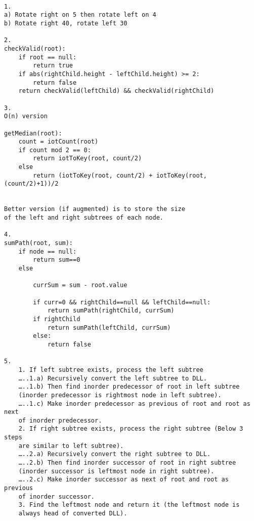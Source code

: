 \documentclass{article}
\begin{document}
\begin{lstlisting}

1. 
a) Rotate right on 5 then rotate left on 4
b) Rotate right 40, rotate left 30

2.
checkValid(root):
    if root == null:
        return true
    if abs(rightChild.height - leftChild.height) >= 2:
        return false
    return checkValid(leftChild) && checkValid(rightChild)
    
3.
O(n) version

getMedian(root):
    count = iotCount(root)
    if count mod 2 == 0:
        return iotToKey(root, count/2)
    else
        return (iotToKey(root, count/2) + iotToKey(root, (count/2)+1))/2


Better version (if augmented) is to store the size 
of the left and right subtrees of each node.

4.
sumPath(root, sum):
    if node == null:
        return sum==0
    else
    
        currSum = sum - root.value
        
        if curr=0 && rightChild==null && leftChild==null:
            return sumPath(rightChild, currSum)
        if rightChild
            return sumPath(leftChild, currSum)
        else:
            return false
        
5.
    1. If left subtree exists, process the left subtree
    …..1.a) Recursively convert the left subtree to DLL.
    …..1.b) Then find inorder predecessor of root in left subtree 
    (inorder predecessor is rightmost node in left subtree).
    …..1.c) Make inorder predecessor as previous of root and root as next 
    of inorder predecessor.
    2. If right subtree exists, process the right subtree (Below 3 steps 
    are similar to left subtree).
    …..2.a) Recursively convert the right subtree to DLL.
    …..2.b) Then find inorder successor of root in right subtree 
    (inorder successor is leftmost node in right subtree).
    …..2.c) Make inorder successor as next of root and root as previous 
    of inorder successor.
    3. Find the leftmost node and return it (the leftmost node is 
    always head of converted DLL).


\end{lstlisting}
\end{document}
